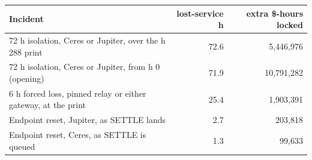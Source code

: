 \begin{tabular}{p{7.3cm} rr}
\toprule
Incident & lost-service h & extra \$-hours locked\\
\midrule
72 h isolation, Ceres or Jupiter, over the h 288 print & 72.6 & 5{,}446{,}976\\
72 h isolation, Ceres or Jupiter, from h 0 (opening) & 71.9 & 10{,}791{,}282\\
6 h forced loss, pinned relay or either gateway, at the print & 25.4 & 1{,}903{,}391\\
Endpoint reset, Jupiter, as SETTLE lands & 2.7 & 203{,}818\\
Endpoint reset, Ceres, as SETTLE is queued & 1.3 & 99{,}633\\
\bottomrule
\end{tabular}
